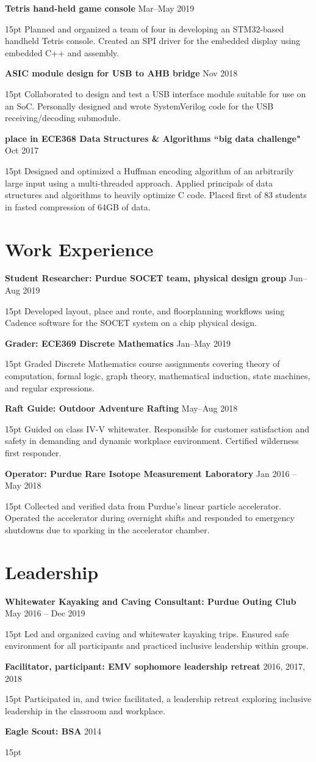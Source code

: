 \documentclass[10pt,letterpaper]{article}
\newcommand{\resumeItem}[3]{
	\textbf{#1} \hfill #2\\
	\begin{adjustwidth}{15pt}{}
	#3
	\end{adjustwidth}
}
\begin{document}
\resumeItem
{Tetris hand-held game console}
{Mar--May 2019}
{Planned and organized a team of four in developing an STM32-based handheld Tetris console. Created an SPI driver for the embedded display using embedded C++ and assembly.}

\resumeItem
{ASIC module design for USB to AHB bridge}
{Nov 2018}
{Collaborated to design and test a USB interface module suitable for use on an SoC. Personally designed and wrote SystemVerilog code for the USB receiving/decoding submodule.}

\resumeItem
{ place in ECE368 Data Structures \& Algorithms ``big data challenge"}
{Oct 2017}
{Designed and optimized a Huffman encoding algorithm of an arbitrarily large input using a multi-threaded approach. Applied principals of data structures and algorithms to heavily optimize C code. Placed first of 83 students in fasted compression of 64GB of data.}


\section*{Work Experience}
\resumeItem
{Student Researcher: Purdue SOCET team, physical design group}
{Jun--Aug 2019}
{Developed layout, place and route, and floorplanning workflows using Cadence software for the SOCET system on a chip physical design.}

\resumeItem
{Grader: ECE369 Discrete Mathematics}
{Jan--May 2019}
{Graded Discrete Mathematics course assignments covering theory of computation, formal logic, graph theory, mathematical induction, state machines, and regular expressions.}

\resumeItem
{Raft Guide: Outdoor Adventure Rafting}
{May--Aug 2018}
{Guided on class IV-V whitewater. Responsible for customer satisfaction and safety in demanding and dynamic workplace environment. Certified wilderness first responder.}

\resumeItem
{Operator: Purdue Rare Isotope Measurement Laboratory}
{Jan 2016 -- May 2018}
{Collected and verified data from Purdue's linear particle accelerator. Operated the accelerator during overnight shifts and responded to emergency shutdowns due to sparking in the accelerator chamber.}


\section*{Leadership}
\resumeItem
{Whitewater Kayaking and Caving Consultant: Purdue Outing Club}
{May 2016 -- Dec 2019}
{Led and organized caving and whitewater kayaking trips. Ensured safe environment for all participants and practiced inclusive leadership within groups.}

\resumeItem
{Facilitator, participant: EMV sophomore leadership retreat}
{2016, 2017, 2018}
{Participated in, and twice facilitated, a leadership retreat exploring inclusive leadership in the classroom and workplace.}

\resumeItem
{Eagle Scout: BSA}
{2014}
{}
\end{document}
